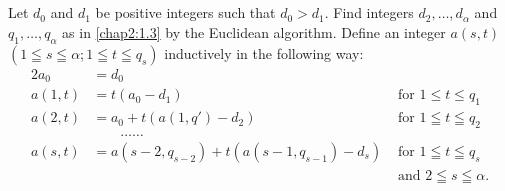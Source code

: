 \subsection{}\label{chap2:1.4}
Let $d_{0}$ and $d_{1}$ be positive integers such that
$d_{0}>d_{1}$. Find integers $d_{2},\ldots,d_{\alpha}$ and
$q_{1},\ldots,q_{\alpha}$ as in \ref{chap2:1.3} by the Euclidean
algorithm. Define an integer $a(s,t)$ $(1\leqq s\leqq\alpha;1\leqq
t\leqq q_{s})$ inductively in the following way:
\begin{alignat*}{2}
a_{0} &= d_{0} & \\
a(1,t) &= t(a_{0}-d_{1}) & \text{ \ for } 1\leq t\leq q_{1}\\
a(2, t) & = a_0+ t(a(1, q') -d_2) & \text{ \ for } 1\leqq t\leqq q_{2}\\
 &\qquad \ldots\ldots & \\
a(s,t) &= a(s-2,q_{s-2})+t(a(s-1,q_{s-1})-d_{s}) & \text{ \ for } 1\leqq
t\leqq q_{s}\\
& &\text{ \ \ \ and } 2\leqq s\leqq \alpha.
\end{alignat*}

